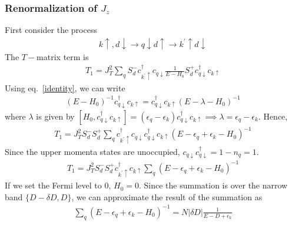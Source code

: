 \documentclass[twoside]{report}
\numberwithin{equation}{section}
\begin{document}
\subsubsection{Renormalization of \(J_z\)}
First consider the process
\begin{equation}\begin{aligned}
k \uparrow, d\downarrow \rightarrow q \downarrow d \uparrow \rightarrow k^\prime \uparrow d\downarrow
\end{aligned}\end{equation}
The \(T-\)matrix term is
\begin{equation}\begin{aligned}
T_1 = J_T^2\sum_q S_d^- c^\dagger_{k^\prime \uparrow}c_{q\downarrow}\frac{1}{E - H_0}S_d^+ c^\dagger_{q \downarrow}c_{k\uparrow}
\end{aligned}\end{equation}
Using eq.~\ref{identity}, we can write
\begin{equation}\begin{aligned}
(E - H_0)^{-1} c^\dagger_{q \downarrow}c_{k\uparrow} = c^\dagger_{q \downarrow}c_{k\uparrow}(E - \lambda -H_0)^{-1}
\end{aligned}\end{equation}
where \(\lambda\) is given by \(\left[H_0,c^\dagger_{q \downarrow}c_{k\uparrow}\right] = (\epsilon_q - \epsilon_k) c^\dagger_{q \downarrow}c_{k\uparrow} \implies \lambda = \epsilon_q - \epsilon_k\).
Hence,
\begin{equation}\begin{aligned}
	T_1 = J_T^2 S_d^- S_d^+ \sum_q c^\dagger_{k^\prime \uparrow}c_{q\downarrow}c^\dagger_{q \downarrow}c_{k\uparrow}\left(E - \epsilon_q + \epsilon_k - H_0\right)^{-1}
\end{aligned}\end{equation}
Since the upper momenta states are unoccupied, \(c_{q\downarrow}c^\dagger_{q \downarrow} = 1 -n_q = 1\).
\begin{equation}\begin{aligned}
	T_1 = J_T^2 S_d^- S_d^+ c^\dagger_{k^\prime \uparrow}c_{k\uparrow}\sum_q \left(E - \epsilon_q + \epsilon_k - H_0\right)^{-1}
\end{aligned}\end{equation}
If we set the Fermi level to 0, \(H_0 = 0\).
Since the summation is over the narrow band \(\{D - \delta D, D\}\), we can approximate the result of the summation as 
\begin{equation}\begin{aligned}
	\sum_q \left(E - \epsilon_q + \epsilon_k - H_0\right)^{-1} = N |\delta D | \frac{1}{E - D + \epsilon_k}
\end{aligned}\end{equation}
\end{document}
